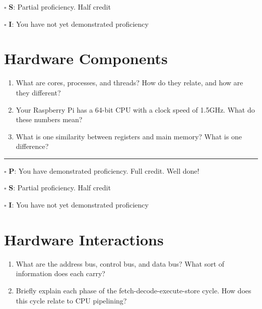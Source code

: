 \documentclass[12pt]{article}
\begin{document}
$\square$ \textbf{S}: Partial proficiency. Half credit

$\square$ \textbf{I}: You have not yet demonstrated proficiency

\newpage



\section*{Hardware Components}

\begin{enumerate}
\item What are cores, processes, and threads? How do they relate, and how are they different?
\vfill

\item Your Raspberry Pi has a 64-bit CPU with a clock speed of 1.5GHz. What do these numbers mean?
\vfill

\item What is one similarity between registers and main memory? What is one difference?
\vfill
\end{enumerate}

\vfill

\rule[1ex]{\textwidth}{.1pt}

$\square$ \textbf{P}: You have demonstrated proficiency. Full credit. Well done!

$\square$ \textbf{S}: Partial proficiency. Half credit

$\square$ \textbf{I}: You have not yet demonstrated proficiency

\newpage



\section*{Hardware Interactions}


\begin{enumerate}
\item What are the address bus, control bus, and data bus? What sort of information does each carry?
\vfill

\item Briefly explain each phase of the fetch-decode-execute-store cycle. How does this cycle relate to CPU pipelining?
\vfill

\end{enumerate}
\end{document}
